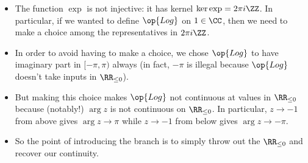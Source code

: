 \documentclass[../notes.tex]{subfiles}
\begin{document}
\begin{itemize}
	\item The function $\exp$ is not injective: it has kernel $\ker\exp=2\pi i\ZZ$. In particular, if we wanted to define $\op{Log}$ on $1\in\CC$, then we need to make a choice among the representatives in $2\pi i\ZZ$.

	\item In order to avoid having to make a choice, we chose $\op{Log}$ to have imaginary part in $[-\pi,\pi)$ always (in fact, $-\pi$ is illegal because $\op{Log}$ doesn't take inputs in $\RR_{\le0}$).
	
	\item But making this choice makes $\op{Log}$ not continuous at values in $\RR_{\le0}$ because (notably!) $\arg z$ is not continuous on $\RR_{\le0}$. In particular, $z\to -1$ from above gives $\arg z\to\pi$ while $z\to-1$ from below gives $\arg z\to-\pi$.

	\item So the point of introducing the branch is to simply throw out the $\RR_{\le0}$ and recover our continuity.
\end{itemize}
\end{document}
